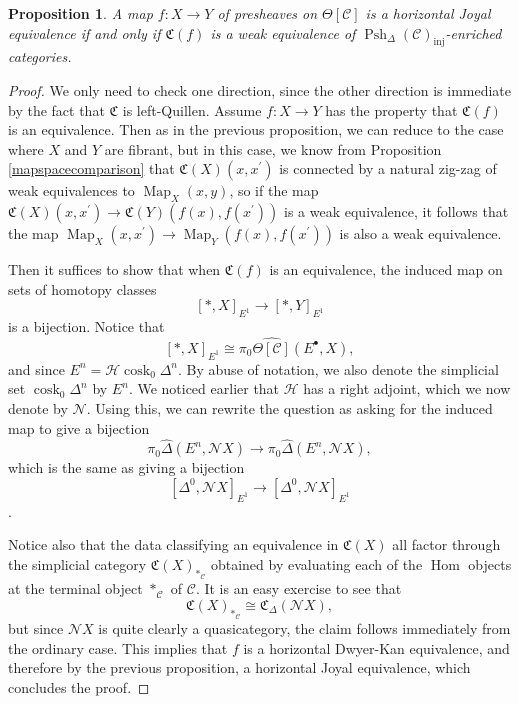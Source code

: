 \documentclass[leqno]{article}
\numberwithin{equation}{subsection}
\theoremstyle{plain}   %
\newtheorem{prop}[equation]{Proposition}
\theoremstyle{remark}
\theoremstyle{plain}
\DeclareMathOperator{\Psh}{Psh}
\DeclareMathOperator{\Map}{Map}
\DeclareMathOperator{\Hom}{Hom}
\newcommand{\psh}[1]{\ensuremath{\widehat{#1}}}
\renewcommand{\C}{\ensuremath{\mathcal{C}}}
\newcommand{\cellset}{\ensuremath{\widehat{\Theta[\mathcal{C}]}}}
\begin{document}
\begin{prop}\label{conservativity}
	A map \(f:X\to Y\) of presheaves on \(\Theta[\C]\) is a horizontal Joyal equivalence if and only if \(\mathfrak{C}(f)\) is a weak equivalence of \(\Psh_\Delta (\C)_{\mathrm{inj}}\)-enriched categories.
\end{prop}
\begin{proof}
	We only need to check one direction, since the other direction is immediate by the fact that \(\mathfrak{C}\) is left-Quillen.  Assume \(f:X\to Y\) has the property that \(\mathfrak{C}(f)\) is an equivalence. Then as in the previous proposition, we can reduce to the case where \(X\) and \(Y\) are fibrant, but in this case, we know from Proposition \ref{mapspacecomparison} that \(\mathfrak{C}(X)(x,x^\prime)\) is connected by a natural zig-zag of weak equivalences to \(\Map_X(x,y)\), so if the map  \(\mathfrak{C}(X)(x,x^\prime)\to \mathfrak{C}(Y)(f(x),f(x^\prime))\) is a weak equivalence, it follows that the map \(\Map_X(x,x^\prime)\to \Map_Y(f(x),f(x^\prime))\) is also a weak equivalence.

	Then it suffices to show that when \(\mathfrak{C}(f)\) is an equivalence, the induced map on sets of homotopy classes
	\[[\ast,X]_{E^1} \to [\ast,Y]_{E^1}\]
	is a bijection.  Notice that
	\[[\ast,X]_{E^1} \cong \pi_0 \cellset(E^\bullet,X),\]
	and since \(E^n=\mathscr{H}\operatorname{cosk}_0 \Delta^n\). By abuse of notation, we also denote the simplicial set \(\operatorname{cosk}_0 \Delta^n\) by \(E^n\).  We noticed earlier that \(\mathscr{H}\) has a right adjoint, which we now denote by \(\mathscr{N}\). Using this, we can rewrite the question as asking for the induced map to give a bijection
	\[\pi_0 \psh{\Delta}(E^n,\mathscr{N}X) \to \pi_0 \psh{\Delta}(E^n,\mathscr{N}X),\]
	which is the same as giving a bijection
	\[[\Delta^0,\mathscr{N}X]_{E^1}\to [\Delta^0,\mathscr{N}X]_{E^1}\].

	Notice also that the data classifying an equivalence in \(\mathfrak{C}(X)\) all factor through the simplicial category \(\mathfrak{C}(X)_{\ast_\C}\) obtained by evaluating each of the \(\Hom\) objects at the terminal object \(\ast_{\C}\) of \(\C\).  It is an easy exercise to see that
	\[\mathfrak{C}(X)_{\ast_\C} \cong \mathfrak{C}_\Delta (\mathscr{N}X),\]
	but since \(\mathscr{N}X\) is quite clearly a quasicategory, the claim follows immediately from the ordinary case.  This implies that \(f\) is a horizontal Dwyer-Kan equivalence, and therefore by the previous proposition, a horizontal Joyal equivalence, which concludes the proof.
\end{proof}
\end{document}

